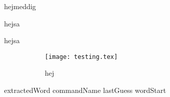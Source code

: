 hejmeddig

hejsa


hejsa




\begin{figure}
\begin{center}
\begin{figure}
\begin{center}

\texttt{[image: testing.tex]}

hej

\end{center}
\end{figure}
\end{center}
\end{figure}





extractedWord
commandName
lastGuess
wordStart

